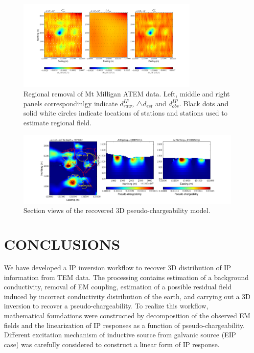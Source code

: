 \documentclass[letterpaper,11pt]{article}
\newcommand{\dip}{d^{IP}}
\begin{document}
\begin{figure}[htb]
  \centering
  \includegraphics[width=0.8\textwidth]{figures/RegRem_field_ch7.png}
  \caption{Regional removal of Mt Milligan ATEM data. Left, middle and right panels correspondinlgy indicate $\dip_{raw}$, $\triangle d_{est}$ and $\dip_{obs}$. Black dots and solid white circles indicate locations of stations and stations used to estimate regional field.}
  \label{Fig:regremoval_field}
\end{figure}

\begin{figure}[htb]
  \centering
  \includegraphics[width=1.0\textwidth]{figures/Peta_field.png}
  \caption{Section views of the recovered 3D pseudo-chargeability model.}
  \label{Fig:Peta_field}
\end{figure}
\clearpage

\section{CONCLUSIONS}
We have developed a IP inversion workflow to recover 3D distribution of IP information from TEM data. The processing contains estimation of a background conductivity, removal of EM coupling, estimation of a possible residual field induced by incorrect conductivity distribution of the earth, and carrying out a 3D inversion to recover a pseudo-chargeability. To realize this workflow, mathematical foundations were constructed by decomposition of the observed EM fields and the linearization of IP responses as a function of pseudo-chargeability. Different excitation mechanism of inductive source from galvanic source (EIP case) was carefully considered to construct a linear form of IP response. 
\end{document}
